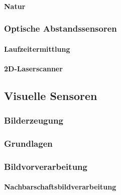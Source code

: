 \documentclass[a4paper, 11pt, accentcolor = tud3b]{tudreport}
\begin{document}
					\paragraph{Natur} %

				\subsubsection{Optische Abstandssensoren} %

					\paragraph{Laufzeitermittlung} %

					\paragraph{2D-Laserscanner} %

			\subsection{Visuelle Sensoren} %

				\subsubsection{Bilderzeugung} %

				\subsubsection{Grundlagen} %

				\subsubsection{Bildvorverarbeitung} %

					\paragraph{Nachbarschaftsbildverarbeitung} %
\end{document}
